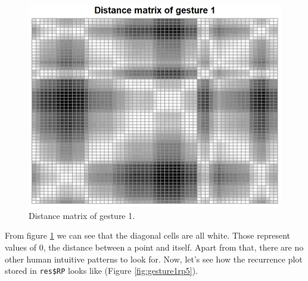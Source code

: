 \documentclass[
  11pt,
]{krantz}
\newenvironment{Shaded}{\begin{snugshade}}{\end{snugshade}}
\newcommand{\AttributeTok}[1]{\textcolor[rgb]{0.61,0.61,0.61}{#1}}
\newcommand{\ConstantTok}[1]{\textcolor[rgb]{0,0,0}{#1}}
\newcommand{\DecValTok}[1]{\textcolor[rgb]{0.06,0.06,0.06}{#1}}
\newcommand{\FunctionTok}[1]{\textcolor[rgb]{0,0,0}{#1}}
\newcommand{\NormalTok}[1]{#1}
\newcommand{\SpecialCharTok}[1]{\textcolor[rgb]{0,0,0}{#1}}
\newcommand{\StringTok}[1]{\textcolor[rgb]{0.5,0.5,0.5}{#1}}
\begin{document}
\begin{figure}

{\centering \includegraphics[width=0.9\linewidth]{images/rp_d} 

}

\caption{Distance matrix of gesture 1.}\label{fig:gesture1D}
\end{figure}

From figure \ref{fig:gesture1D} we can see that the diagonal cells are all white. Those represent values of \(0\), the distance between a point and itself. Apart from that, there are no other human intuitive patterns to look for. Now, let's see how the recurrence plot stored in \texttt{res\$RP} looks like (Figure \ref{fig:gesture1rp5}).

\begin{Shaded}
\end{Shaded}
\end{document}
